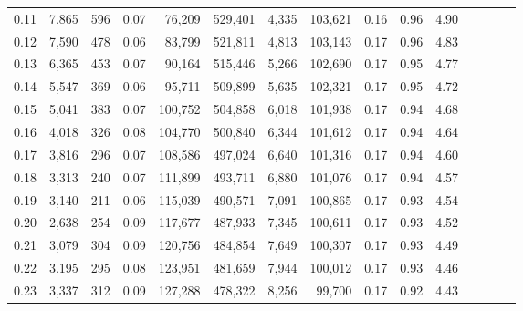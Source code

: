 \begin{tabular}{rrrcrrrrrrrrrrr}
0.11 &   7,865 &    596 &                                       0.07 &   76,209 &  529,401 &    4,335 &  103,621 &  0.16 &  0.96 &                         4.90 \\
0.12 &   7,590 &    478 &                                       0.06 &   83,799 &  521,811 &    4,813 &  103,143 &  0.17 &  0.96 &                         4.83 \\
0.13 &   6,365 &    453 &                                       0.07 &   90,164 &  515,446 &    5,266 &  102,690 &  0.17 &  0.95 &                         4.77 \\
0.14 &   5,547 &    369 &                                       0.06 &   95,711 &  509,899 &    5,635 &  102,321 &  0.17 &  0.95 &                         4.72 \\
0.15 &   5,041 &    383 &                                       0.07 &  100,752 &  504,858 &    6,018 &  101,938 &  0.17 &  0.94 &                         4.68 \\
0.16 &   4,018 &    326 &                                       0.08 &  104,770 &  500,840 &    6,344 &  101,612 &  0.17 &  0.94 &                         4.64 \\
0.17 &   3,816 &    296 &                                       0.07 &  108,586 &  497,024 &    6,640 &  101,316 &  0.17 &  0.94 &                         4.60 \\
0.18 &   3,313 &    240 &                                       0.07 &  111,899 &  493,711 &    6,880 &  101,076 &  0.17 &  0.94 &                         4.57 \\
0.19 &   3,140 &    211 &                                       0.06 &  115,039 &  490,571 &    7,091 &  100,865 &  0.17 &  0.93 &                         4.54 \\
0.20 &   2,638 &    254 &                                       0.09 &  117,677 &  487,933 &    7,345 &  100,611 &  0.17 &  0.93 &                         4.52 \\
0.21 &   3,079 &    304 &                                       0.09 &  120,756 &  484,854 &    7,649 &  100,307 &  0.17 &  0.93 &                         4.49 \\
0.22 &   3,195 &    295 &                                       0.08 &  123,951 &  481,659 &    7,944 &  100,012 &  0.17 &  0.93 &                         4.46 \\
0.23 &   3,337 &    312 &                                       0.09 &  127,288 &  478,322 &    8,256 &   99,700 &  0.17 &  0.92 &                         4.43 \\

\end{tabular}
